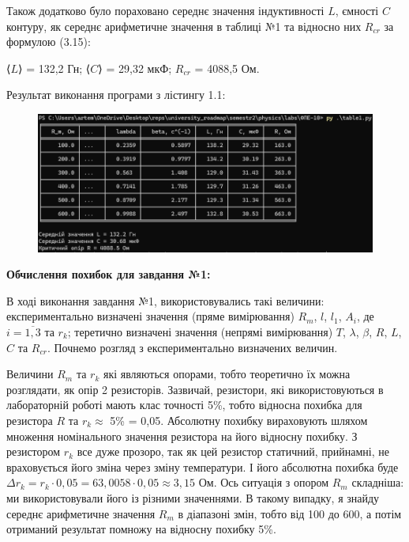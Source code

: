 \documentclass[12pt,a4paper]{article}
\begin{document}
    Також додатково було пораховано середнє значення індуктивності $L$, ємності $C$ контуру, як середнє арифметичне значення в таблиці №1 та відносно них
    $R_{cr}$ за формулою (3.15):

    \vspace{1em} %
    \setlength{\parindent}{0pt}

    ⟨$L$⟩ = 132,2 Гн; ⟨$C$⟩ = 29,32 мкФ;   $R_{cr}$ = 4088,5 Ом.

    \newpage

    Результат виконання програми з лістингу 1.1:

    \begin{figure}[ht]
        \centering
        \includegraphics[width=1\textwidth]{table1_results.png}
    \end{figure}

    \vspace{1em} %

    \textbf{\large Обчислення похибок для завдання №1:}

    \vspace{1em} %
    \setlength{\parindent}{1.5em}

    В ході виконання завдання №1, використовувались такі величини: експериментально визначені значення (пряме вимірювання) $R_m$, $l$, $l_1$, $A_i$, де $i = \overline{1, 3}$ та $r_k$;
    теретично визначені значення (непрямі вимірювання) $T$, $\lambda$, $\beta$, $R$, $L$, $C$ та $R_{cr}$. Почнемо розгляд з експериментально визначених величин.

    Величини $R_m$ та $r_k$ які являються опорами, тобто теоретично їх можна розглядати, як опір 2 резисторів. Зазвичай, резистори,
    які використовуються в лабораторній роботі мають клас точності 5\%, тобто відносна похибка для резистора $R$ та $r_k \approx$ 5\% = 0,05. Абсолютну похибку
    вираховують шляхом множення номінального значення резистора на його відносну похибку. З резистором $r_k$ все дуже прозоро, так як цей резистор статичний, прийнамні, не враховується його зміна через зміну температури.
    І його абсолютна похибка буде $\Delta r_k = r_k \cdot 0,05 = 63,0058 \cdot 0,05 \approx 3,15$ Ом. Ось ситуація з опором $R_m$ складніша: ми використовували його із різними значеннями.
    В такому випадку, я знайду середнє арифметичне значення $R_m$ в діапазоні змін, тобто від 100 до 600, а потім отриманий результат помножу на відносну похибку 5\%.
\end{document}
